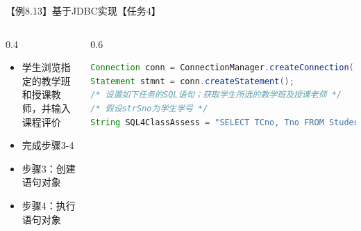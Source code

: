 \begin{frame}{【例8.13】基于JDBC实现【任务4】}
\begin{columns}
\begin{column}{0.4\textwidth}
\vspace{-2ex}
\begin{itemize}
    \item 学生浏览指定的教学班和授课教师，并输入课程评价
    \item 完成步骤3-4
    \item 步骤3：创建语句对象
    \item 步骤4：执行语句对象
\end{itemize}
\end{column}

\begin{column}{0.6\textwidth}
\vspace{-4ex}
\begin{block}{}
\begin{lstlisting}[language=Java, linewidth=\textwidth, basicstyle=\ttfamily\tiny]
Connection conn = ConnectionManager.createConnection();
Statement stmnt = conn.createStatement();
/* 设置如下任务的SQL语句；获取学生所选的教学班及授课老师 */
/* 假设strSno为学生学号 */
String SQL4ClassAssess = "SELECT TCno, Tno FROM Student, Teacher, Teaching, SC WHERE Teacher.Tno=Teaching.Tno AND Teaching.TCno=SC.TCno AND SC.sno="+strSno;                          
\end{lstlisting}
\end{block}
\end{column}

\end{columns}
\end{frame}


